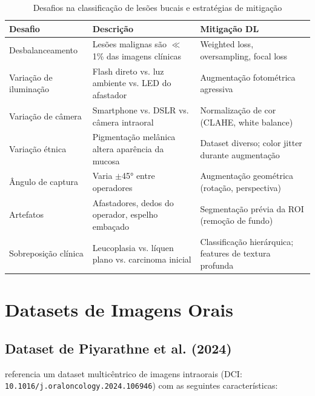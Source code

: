 \begin{table}[H]
  \centering
  \caption{Desafios na classificação de lesões bucais e estratégias de mitigação}
  \label{tab:desafios-lesoes}
  \begin{tabularx}{\textwidth}{p{3cm}Xp{4cm}}
    \toprule
    \textbf{Desafio} & \textbf{Descrição} & \textbf{Mitigação DL} \\
    \midrule
    Desbalanceamento & Lesões malignas são $\ll$ 1\% das imagens clínicas &
        Weighted loss, oversampling, focal loss \\
    Variação de iluminação & Flash direto vs. luz ambiente vs. LED do afastador &
        Augmentação fotométrica agressiva \\
    Variação de câmera & Smartphone vs. DSLR vs. câmera intraoral &
        Normalização de cor (CLAHE, white balance) \\
    Variação étnica & Pigmentação melânica altera aparência da mucosa &
        Dataset diverso; color jitter durante augmentação \\
    Ângulo de captura & Varia $\pm$45° entre operadores &
        Augmentação geométrica (rotação, perspectiva) \\
    Artefatos & Afastadores, dedos do operador, espelho embaçado &
        Segmentação prévia da ROI (remoção de fundo) \\
    Sobreposição clínica & Leucoplasia vs. líquen plano vs. carcinoma inicial &
        Classificação hierárquica; features de textura profunda \\
    \bottomrule
  \end{tabularx}
\end{table}

\section{Datasets de Imagens Orais}
\label{sec:datasets-orais}

\subsection{Dataset de Piyarathne et al. (2024)}

 referencia um dataset multicêntrico de imagens intraorais
(DCI: \texttt{10.1016/j.oraloncology.2024.106946}) com as seguintes
características:

